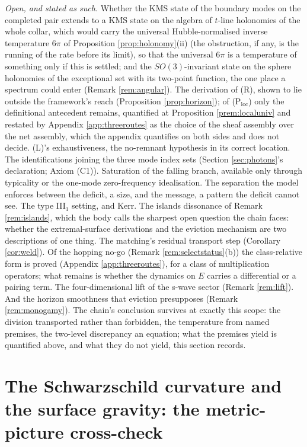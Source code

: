 \documentclass[11pt]{article}
\theoremstyle{definition}
\begin{document}
\emph{Open, and stated as such.} Whether the KMS state of the boundary modes on the completed pair extends to a KMS state on the algebra of $t$-line holonomies of the whole collar, which would carry the universal Hubble-normalised inverse temperature $6\pi$ of Proposition \ref{prop:holonomy}(ii) (the obstruction, if any, is the running of the rate before its limit), so that the universal $6\pi$ is a temperature of something only if this is settled; and the $SO(3)$-invariant state on the sphere holonomies of the exceptional set with its two-point function, the one place a spectrum could enter (Remark \ref{rem:angular}). The derivation of (R), shown to lie outside the framework's reach (Proposition \ref{prop:horizon}); of (P$_{\mathrm{loc}}$) only the definitional antecedent remains, quantified at Proposition \ref{prem:localuniv} and restated by Appendix \ref{app:threeroutes} as the choice of the sheaf assembly over the net assembly, which the appendix quantifies on both sides and does not decide. (L)'s exhaustiveness, the no-remnant hypothesis in its correct location. The identifications joining the three mode index sets (Section \ref{sec:photons}'s declaration; Axiom (C1)). Saturation of the falling branch, available only through typicality or the one-mode zero-frequency idealisation. The separation the model enforces between the deficit, a size, and the message, a pattern the deficit cannot see. The type III$_1$ setting, and Kerr. The islands dissonance of Remark \ref{rem:islands}, which the body calls the sharpest open question the chain faces: whether the extremal-surface derivations and the eviction mechanism are two descriptions of one thing. The matching's residual transport step (Corollary \ref{cor:weld}). Of the hopping no-go (Remark \ref{rem:selectstatus}(b)) the class-relative form is proved (Appendix \ref{app:threeroutes}), for a class of multiplication operators; what remains is whether the dynamics on $E$ carries a differential or a pairing term. The four-dimensional lift of the s-wave sector (Remark \ref{rem:lift}). And the horizon smoothness that eviction presupposes (Remark \ref{rem:monogamy}). The chain's conclusion survives at exactly this scope: the division transported rather than forbidden, the temperature from named premises, the two-level discrepancy an equation; what the premises yield is quantified above, and what they do not yield, this section records.

\appendix

\section{The Schwarzschild curvature and the surface gravity: the metric-picture cross-check}\label{app:schw}
\end{document}
